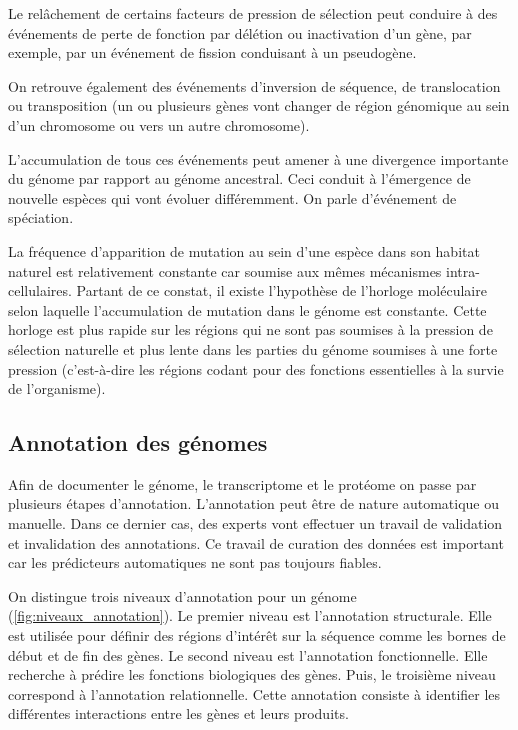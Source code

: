 \begin{refsegment}
    Le relâchement de certains facteurs de pression de sélection peut conduire à des événements de perte de fonction par délétion ou inactivation d’un gène, par exemple, par un événement de fission conduisant à un pseudogène.
    
    On retrouve également des événements d’inversion de séquence, de translocation ou transposition (un ou plusieurs gènes vont changer de région génomique au sein d’un chromosome ou vers un autre chromosome).
    
    L’accumulation de tous ces événements peut amener à une divergence importante du génome par rapport au génome ancestral. Ceci conduit à l’émergence de nouvelle espèces qui vont évoluer différemment. On parle d'événement de spéciation.
    
    La fréquence d'apparition de mutation au sein d'une espèce dans son habitat naturel est relativement constante car soumise aux mêmes mécanismes intra-cellulaires. Partant de ce constat, il existe l'hypothèse de l’horloge moléculaire selon laquelle l'accumulation de mutation dans le génome est constante. Cette horloge est plus rapide sur les régions qui ne sont pas soumises à la pression de sélection naturelle et plus lente dans les parties du génome soumises à une forte pression (c'est-à-dire les régions codant pour des fonctions essentielles à la survie de l'organisme).
    
    
    \subsection{Annotation des génomes}\label{subsec:annotation}
    
    Afin de documenter le génome, le transcriptome et le protéome on passe par plusieurs étapes d’annotation. L’annotation peut être de nature automatique ou manuelle. Dans ce dernier cas, des experts vont effectuer un travail de validation et invalidation des annotations. Ce travail de curation des données est important car les prédicteurs automatiques ne sont pas toujours fiables.
    
    On distingue trois niveaux d’annotation pour un génome (\cref{fig:niveaux_annotation}). Le premier niveau est l’annotation structurale. Elle est utilisée pour définir des régions d’intérêt sur la séquence comme les bornes de début et de fin des gènes.  Le second niveau est l’annotation fonctionnelle. Elle recherche à prédire les fonctions biologiques des gènes. Puis, le troisième niveau correspond à l’annotation relationnelle. Cette annotation consiste à identifier les différentes interactions entre les gènes et leurs produits.
    

\end{refsegment}
